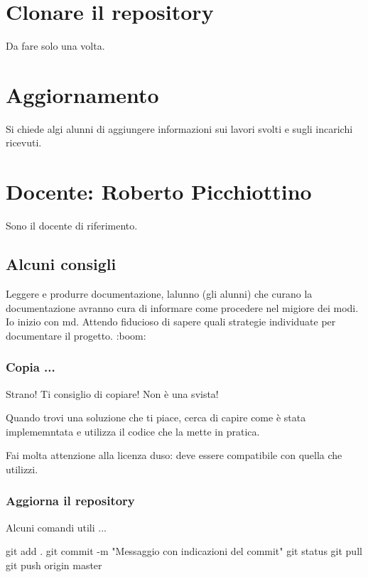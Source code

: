 \section*{Clonare il repository}

Da fare solo una volta. 
 \section*{Aggiornamento}

Si chiede algi alunni di aggiungere informazioni sui lavori svolti e sugli incarichi ricevuti.

\section*{Docente\+: Roberto Picchiottino}

Sono il docente di riferimento.

\subsection*{Alcuni consigli}

Leggere e produrre documentazione, l\textquotesingle{}alunno (gli alunni) che curano la documentazione avranno cura di informare come procedere nel migiore dei modi. Io inizio con md. Attendo fiducioso di sapere quali strategie individuate per documentare il progetto. \+:boom\+:

\subsubsection*{Copia ...}

Strano! Ti consiglio di copiare! Non è una svista!

Quando trovi una soluzione che ti piace, cerca di capire come è stata implememntata e utilizza il codice che la mette in pratica.

Fai molta attenzione alla licenza d\textquotesingle{}uso\+: deve essere compatibile con quella che utilizzi.

\subsubsection*{Aggiorna il repository}

Alcuni comandi utili ... 
\begin{DoxyCode}
git add .
git commit -m "Messaggio con indicazioni del commit"
git status
git pull
git push origin master
\end{DoxyCode}


